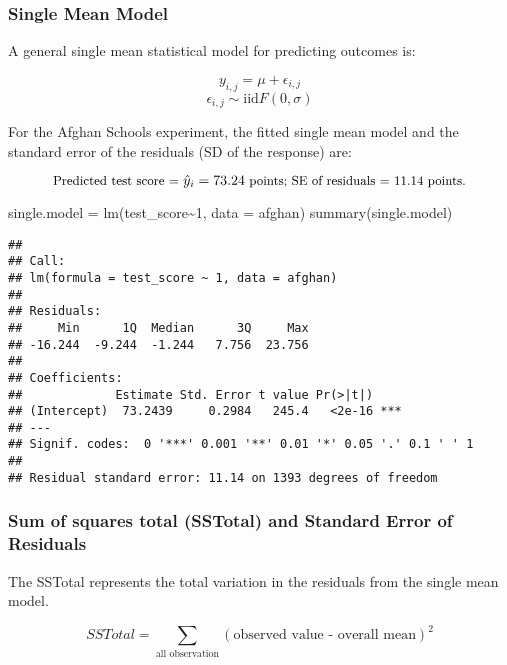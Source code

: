 \documentclass[
]{article}
\newenvironment{Shaded}{\begin{snugshade}}{\end{snugshade}}
\newcommand{\AttributeTok}[1]{\textcolor[rgb]{0.77,0.63,0.00}{#1}}
\newcommand{\DecValTok}[1]{\textcolor[rgb]{0.00,0.00,0.81}{#1}}
\newcommand{\FunctionTok}[1]{\textcolor[rgb]{0.00,0.00,0.00}{#1}}
\newcommand{\NormalTok}[1]{#1}
\newcommand{\OtherTok}[1]{\textcolor[rgb]{0.56,0.35,0.01}{#1}}
\newcommand{\SpecialCharTok}[1]{\textcolor[rgb]{0.00,0.00,0.00}{#1}}
\begin{document}
\hypertarget{single-mean-model}{%
\subsubsection{Single Mean Model}\label{single-mean-model}}

A general single mean statistical model for predicting outcomes is:

\[ y_{i,j}  = \mu + \epsilon_{i,j} \]
\[ \epsilon_{i,j} \sim \text{iid} F(0,\sigma)\]

For the Afghan Schools experiment, the fitted single mean model and the
standard error of the residuals (SD of the response) are:

\[\small\text{Predicted test score = }\hat{y}_i = 73.24 \text{ points;  SE of residuals = 11.14 points.}\]

\begin{Shaded}
\begin{Highlighting}[]
\NormalTok{single.model }\OtherTok{=} \FunctionTok{lm}\NormalTok{(test\_score}\SpecialCharTok{\textasciitilde{}}\DecValTok{1}\NormalTok{, }\AttributeTok{data =}\NormalTok{ afghan)}
\FunctionTok{summary}\NormalTok{(single.model)}
\end{Highlighting}
\end{Shaded}

\begin{verbatim}
## 
## Call:
## lm(formula = test_score ~ 1, data = afghan)
## 
## Residuals:
##     Min      1Q  Median      3Q     Max 
## -16.244  -9.244  -1.244   7.756  23.756 
## 
## Coefficients:
##             Estimate Std. Error t value Pr(>|t|)    
## (Intercept)  73.2439     0.2984   245.4   <2e-16 ***
## ---
## Signif. codes:  0 '***' 0.001 '**' 0.01 '*' 0.05 '.' 0.1 ' ' 1
## 
## Residual standard error: 11.14 on 1393 degrees of freedom
\end{verbatim}

\hypertarget{sum-of-squares-total-sstotal-and-standard-error-of-residuals}{%
\subsubsection{Sum of squares total (SSTotal) and Standard Error of
Residuals}\label{sum-of-squares-total-sstotal-and-standard-error-of-residuals}}

The SSTotal represents the total variation in the residuals from the
single mean model.

\[SSTotal = \sum_{\text{all observation}}(\text{observed value - overall mean})^2\]
\end{document}
